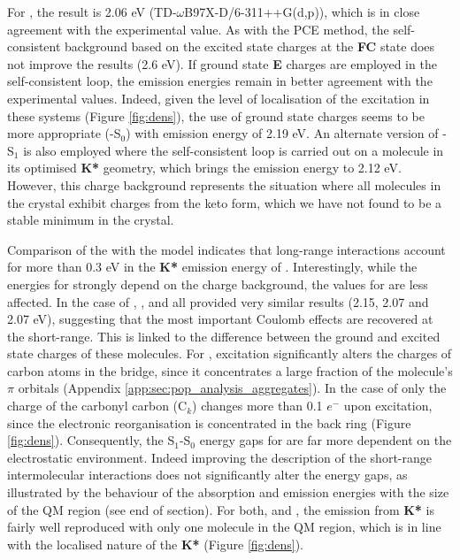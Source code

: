 For \HC{}, the result is 2.06 eV (TD-$\omega$B97X-D\slash{}6-311++G(d,p)), which is in close agreement with the experimental value. As with the PCE method, the self-consistent background based on the excited state charges at the \textbf{FC} state does not improve the results (2.6 eV). If ground state \textbf{E} charges are employed in the self-consistent loop, the emission energies remain in better agreement with the experimental values. Indeed, given the level of localisation of the excitation in these systems (Figure \ref{fig:dens}), the use of ground state charges seems to be more appropriate (\SCEEC{}-S$_0$) with emission energy of 2.19 eV. An alternate version of \SCEEC{}-S$_1$ is also employed where the self-consistent loop is carried out on a molecule in its \EEC{} optimised \textbf{K*} geometry, which brings the emission energy to 2.12 eV. However, this charge background represents the situation where all molecules in the crystal exhibit charges from the keto form, which we have not found to be a stable minimum in the crystal.



Comparison of the \EEC{} with the \EC{} model indicates that long-range interactions account for more than 0.3 eV in the \textbf{K*} emission energy of \HC{}.  Interestingly, while the energies for \HC{} strongly depend on the charge background, the values for \HCC{} are less affected. In the case of \HCC{}, \SCEEC{}, \EEC{} and \EC{} all provided very similar results (2.15, 2.07 and 2.07 eV), suggesting that the most important Coulomb effects are recovered at the short-range. This is linked to the difference between the ground and excited state charges of these molecules. For \HC{}, excitation significantly alters the charges of carbon atoms in the bridge, since it concentrates a large fraction of the molecule's $\pi$ orbitals (Appendix \ref{app:sec:pop_analysis_aggregates}). In the case of \HCC{} only the charge of the carbonyl carbon (C$_k$) changes more than 0.1 $e^-$ upon excitation, since the electronic reorganisation is concentrated in the back ring (Figure \ref{fig:dens}). Consequently, the S$_1$-S$_0$ energy gaps for \HC{} are far more dependent on the electrostatic environment. Indeed improving the description of the short-range intermolecular interactions does not significantly alter the energy gaps, as illustrated by the behaviour of the absorption and emission energies with the size of the QM region (see end of section). For both, \HC{} and \HCC{}, the emission from \textbf{K*} is fairly well reproduced with only one molecule in the QM region, which is in line with the localised nature of the \textbf{K*} (Figure \ref{fig:dens}).



